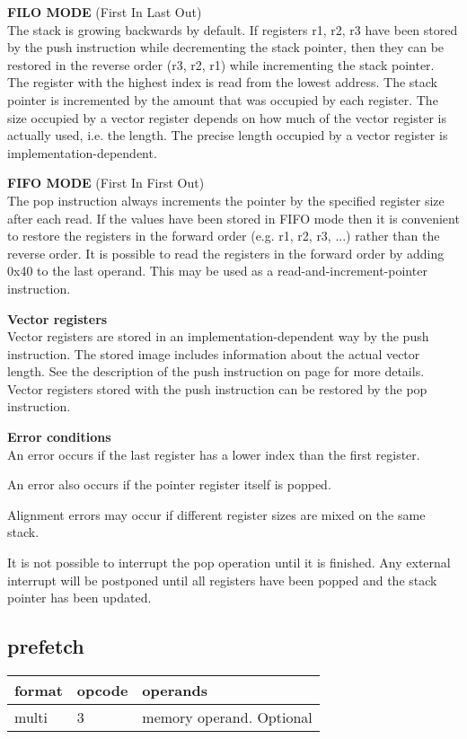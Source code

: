 \documentclass[forwardcom.tex]{subfiles}
\begin{document}
\textbf{FILO MODE} (First In Last Out) \\
The stack is growing backwards by default. If registers r1, r2, r3 have been stored by the push instruction while decrementing the stack pointer, then they can be restored in the reverse order (r3, r2, r1) while incrementing the stack pointer. The  register with the highest index is read from the lowest address. The stack pointer is incremented by the amount that was occupied by each register. The size occupied by a vector register depends on how much of the vector register is actually used, i.e. the length. The precise length occupied by a vector register is implementation-dependent.
\vv

\textbf{FIFO MODE} (First In First Out) \\
The pop instruction always increments the pointer by the specified register size after each read. If the values have been stored in FIFO mode then it is convenient to restore the registers in the forward order (e.g. r1, r2, r3, ...) rather than the reverse order. 
It is possible to read the registers in the forward order by adding 0x40 to the last operand. This may be used as a read-and-increment-pointer instruction.
\vv

\textbf{Vector registers}\\
Vector registers are stored in an implementation-dependent way by the push instruction. The stored image includes information about the actual vector length. 
See the description of the push instruction on page \pageref{table:pushInstruction} for more details. Vector registers stored with the push instruction can be restored by the pop instruction.
\vv


\textbf{Error conditions}\\
An error occurs if the last register has a lower index than the first register.
\vv

An error also occurs if the pointer register itself is popped.
\vv

Alignment errors may occur if different register sizes are mixed on the same stack.
\vv

It is not possible to interrupt the pop operation until it is finished. Any external interrupt will be postponed until all registers have been popped and the stack pointer has been updated.
\vv


\subsection{prefetch}
\label{table:prefetchInstruction}
\begin{tabular}{|p{12mm}|p{15mm}|p{100mm}|}
\hline
\bfseries format & \bfseries opcode & \bfseries operands \\ \hline
multi & 3 & memory operand. Optional \\ \hline
\end{tabular}
\vv
\end{document}
